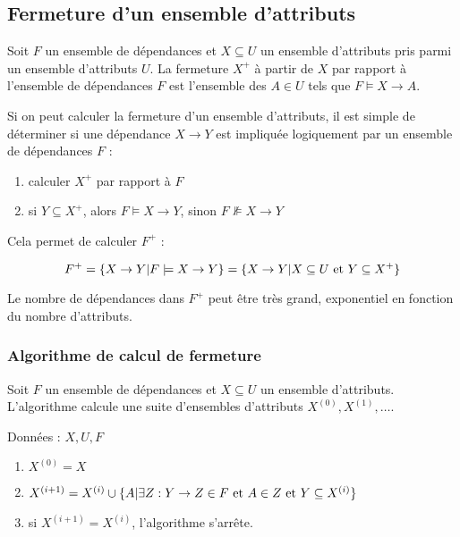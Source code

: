 		\subsection{Fermeture d'un ensemble d'attributs}
		
		Soit $F$ un ensemble de dépendances et $X \subseteq U$ un ensemble d'attributs pris parmi un ensemble d'attributs $U$. La fermeture $X^+$ à partir de $X$ par rapport à l'ensemble de dépendances $F$ est l'ensemble des $A \in U$ tels que $F \models X \rightarrow A$.
		
		Si on peut calculer la fermeture d'un ensemble d'attributs, il est simple de déterminer si une dépendance $X \rightarrow Y$ est impliquée logiquement par un ensemble de dépendances $F$ :
		
		\begin{enumerate}
			\item calculer $X^+$ par rapport à $F$
			\item si $Y \subseteq X^+$, alors $F \models X \rightarrow Y$, sinon $F \nVDash X \rightarrow Y$
		\end{enumerate}
		
		Cela permet de calculer $F^+$ :
		
		$$F^+ = \lbrace X \rightarrow Y \vert F \models X \rightarrow Y  \rbrace = \lbrace  X \rightarrow Y \vert X \subseteq U \text{ et } Y \subseteq X^+  \rbrace$$
		
		Le nombre de dépendances dans $F^+$ peut être très grand, exponentiel en fonction du nombre d'attributs.
		
			\subsubsection{Algorithme de calcul de fermeture}
			
			Soit $F$ un ensemble de dépendances et $X \subseteq U$ un ensemble d'attributs. L'algorithme calcule une suite d'ensembles d'attributs $X^{(0)}, X^{(1)}, \dots$.
			
			Données : $X, U, F$
			
			\begin{enumerate}
				\item $X^{(0)} = X$
				\item $X^{(i + 1)} = X^{(i)} \cup \lbrace  A \vert \exists Z : Y \rightarrow Z \in F \text{ et } A \in Z \text{ et } Y \subseteq X^{(i)}  \rbrace$
				
				\item si $X^{(i + 1)} = X^{(i)}$, l'algorithme s'arrête.
			\end{enumerate}
			
